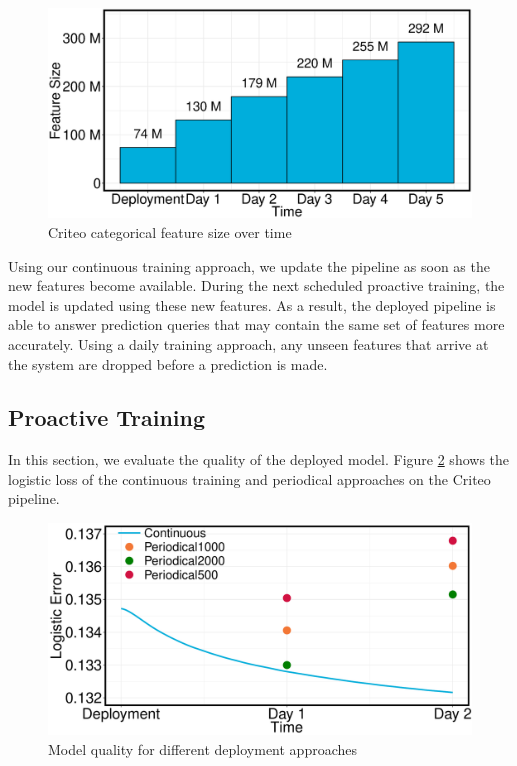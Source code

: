\begin{figure}[h!]
\includegraphics[width=\columnwidth]{../images/experiment-results/criteo-feature-discovery-experiment.eps}
\caption{Criteo categorical feature size over time}
\label{fig:criteo-feature-discovery}
\end{figure}

Using our continuous training approach, we update the pipeline as soon as the new features become available.
During the next scheduled proactive training, the model is updated using these new features.
As a result, the deployed pipeline is able to answer prediction queries that may contain the same set of features more accurately.
Using a daily training approach, any unseen features that arrive at the system are dropped before a prediction is made.

\subsection{Proactive Training}\label{subsec:proactive-training}
In this section, we evaluate the quality of the deployed model.
Figure \ref{fig:loss-proactive-vs-daily} shows the logistic loss of the continuous training and periodical approaches on the Criteo pipeline.

\begin{figure}[h!]
\centering
\includegraphics[width=\columnwidth]{../images/experiment-results/criteo-proactive-training.pdf}
\caption{Model quality for different deployment approaches}
\label{fig:loss-proactive-vs-daily}
\vspace{2mm}
\end{figure}


